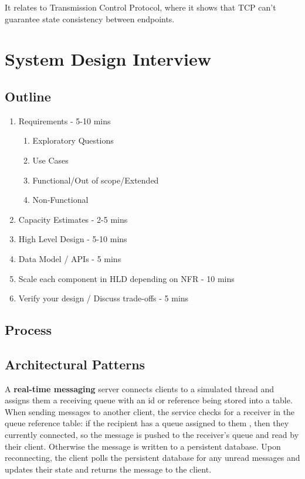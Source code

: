 \documentclass{article}
\begin{document}
    It relates to Transmission Control Protocol, where it shows that TCP can't guarantee state consistency between endpoints.

\newpage
\section{System Design Interview}
\subsection{Outline}
\begin{enumerate}
    \item Requirements - 5-10 mins
    \begin{enumerate}
        \item Exploratory Questions
        \item Use Cases
        \item Functional/Out of scope/Extended
        \item Non-Functional
    \end{enumerate}
    \item Capacity Estimates - 2-5 mins
    \item High Level Design - 5-10 mins
    \item Data Model / APIs - 5 mins
    \item Scale each component in HLD depending on NFR - 10 mins
    \item Verify your design / Discuss trade-offs - 5 mins
\end{enumerate}

\subsection{Process}

\subsection{Architectural Patterns}
    
    A \textbf{real-time messaging} server connects clients to a simulated thread and assigns them a receiving queue with an id or reference being stored into a table. When sending messages to another client, the service checks for a receiver in the queue reference table: if the recipient has a queue assigned to them , then they currently connected, so the message is pushed to the receiver's queue and read by their client. Otherwise the message is written to a persistent database. Upon reconnecting, the client polls the persistent database for any unread messages and updates their state and returns the message to the client.
\end{document}
